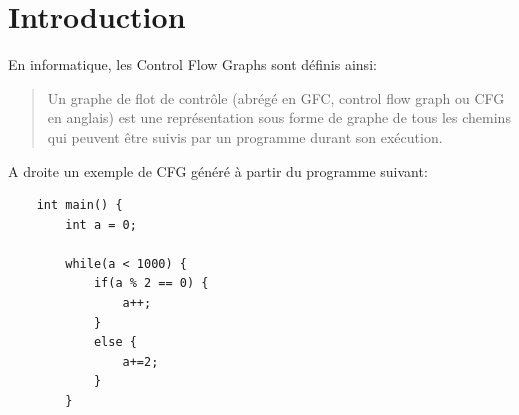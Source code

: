 \section{Introduction}
\begin{multicols}{2}
En informatique, les Control Flow Graphs sont définis ainsi:
\begin{quotation}
    Un graphe de flot de contrôle (abrégé en GFC, control flow graph ou CFG en anglais) est une représentation sous forme de graphe de tous les chemins qui peuvent être suivis par un programme durant son exécution. \cite{wiki:Graphe_de_flot_de_controle}
\end{quotation}
A droite un exemple de CFG généré à partir du programme suivant:
\begin{lstlisting}
    int main() {
        int a = 0;
        
        while(a < 1000) {
            if(a % 2 == 0) {
                a++;
            }
            else {
                a+=2;
            }
        }
    

\end{lstlisting}
\end{multicols}
